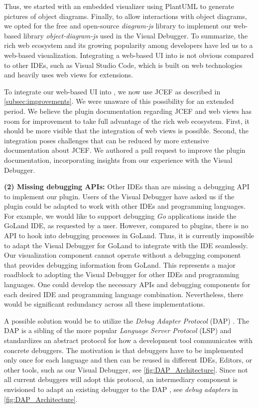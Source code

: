 \documentclass[sigconf]{acmart}
\begin{document}
Thus, we started with an embedded visualizer using PlantUML \cite{arnaudroquesPlantUML2023} to generate pictures of object diagrams.
Finally, to allow interactions with object diagrams, we opted for the free and open-source \textit{diagram-js} library to implement our web-based library \textit{object-diagram-js} \cite{timkrauterObjectdiagramjs2023} used in the Visual Debugger.
To summarize, the rich web ecosystem and its growing popularity among developers have led us to a web-based visualization.
Integrating a web-based UI into \intellij{} is not obvious compared to other IDEs, such as Visual Studio Code, which is built on web technologies and heavily uses web views for extensions.

To integrate our web-based UI into \intellij{}, we now use JCEF as described in \autoref{subsec:improvements}.
We were unaware of this possibility for an extended period.
We believe the plugin documentation regarding JCEF and web views has room for improvement to take full advantage of the rich web ecosystem.
First, it should be more visible that the integration of web views is possible.
Second, the integration poses challenges that can be reduced by more extensive documentation about JCEF.
We authored a pull request to improve the plugin documentation, incorporating insights from our experience with the Visual Debugger.

\textbf{(2) Missing debugging APIs:} Other IDEs than \intellij{} are missing a debugging API to implement our plugin.
Users of the Visual Debugger have asked us if the plugin could be adapted to work with other IDEs and programming languages.
For example, we would like to support debugging \textit{Go} applications inside the GoLand IDE, as requested by a user.
However, compared to \intellij{} plugins, there is no API to hook into debugging processes in GoLand.
Thus, it is currently impossible to adapt the Visual Debugger for GoLand to integrate with the IDE seamlessly.
Our visualization component cannot operate without a debugging component that provides debugging information from GoLand.
This represents a major roadblock to adopting the Visual Debugger for other IDEs and programming languages.
One could develop the necessary APIs and debugging components for each desired IDE and programming language combination.
Nevertheless, there would be significant redundancy across all these implementations.

A possible solution would be to utilize the \textit{Debug Adapter Protocol} (DAP) \cite{microsoftDebugAdapterProtocol2023}.
The DAP is a sibling of the more popular \textit{Language Server Protocol} (LSP) \cite{microsoftLanguageServerProtocol2023} and standardizes an abstract protocol for how a development tool communicates with concrete debuggers.
The motivation is that debuggers have to be implemented only once for each language and then can be reused in different IDEs, Editors, or other tools, such as our Visual Debugger, see \autoref{fig:DAP_Architecture}.
Since not all current debuggers will adopt this protocol, an intermediary component is envisioned to adapt an existing debugger to the DAP \cite{microsoftDebugAdapterProtocol2023}, see \textit{debug adapters} in \autoref{fig:DAP_Architecture}.
\end{document}
